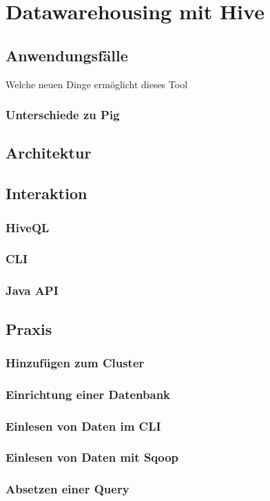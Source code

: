 \chapter{Datawarehousing mit Hive}
\section{Anwendungsfälle}
Welche neuen Dinge ermöglicht dieses Tool
\subsection{Unterschiede zu Pig}
\section{Architektur}
\section{Interaktion}
\subsection{HiveQL}
\subsection{CLI}
\subsection{Java API}
\section{Praxis}
\subsection{Hinzufügen zum Cluster}
\subsection{Einrichtung einer Datenbank}
\subsection{Einlesen von Daten im CLI}
\subsection{Einlesen von Daten mit Sqoop}
\subsection{Absetzen einer Query}
